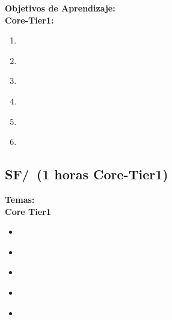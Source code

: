 \noindent \textbf{Objetivos de Aprendizaje:}\\
\noindent \textbf{Core-Tier1:}
\begin{enumerate}
	\setcounter{enumi}{0}
	\item \SFStateandStateMachinesLODescribeComputations\xspace[\SFStateandStateMachinesLODescribeComputationsLevel]\label{sec:BOK:SFStateandStateMachinesLODescribeComputations}
	\item \SFStateandStateMachinesLODescribeTheSystems\xspace[\SFStateandStateMachinesLODescribeTheSystemsLevel]\label{sec:BOK:SFStateandStateMachinesLODescribeTheSystems}
	\item \SFStateandStateMachinesLODescribeAA\xspace[\SFStateandStateMachinesLODescribeAALevel]\label{sec:BOK:SFStateandStateMachinesLODescribeAA}
	\item \SFStateandStateMachinesLOExplainHowOr\xspace[\SFStateandStateMachinesLOExplainHowOrLevel]\label{sec:BOK:SFStateandStateMachinesLOExplainHowOr}
	\item \SFStateandStateMachinesLODevelopState\xspace[\SFStateandStateMachinesLODevelopStateLevel]\label{sec:BOK:SFStateandStateMachinesLODevelopState}
	\item \SFStateandStateMachinesLODeriveTime\xspace[\SFStateandStateMachinesLODeriveTimeLevel]\label{sec:BOK:SFStateandStateMachinesLODeriveTime}
\end{enumerate}


\subsection{SF/\SFParallelism~(1 horas Core-Tier1)}\label{sec:BOK:SFParallelism}
\noindent \textbf{Temas:}\\
\noindent \textbf{Core Tier1}
\begin{itemize}
	\item \SFParallelismTopicSequential\label{sec:BOK:SFParallelismTopicSequential}
	\item \SFParallelismTopicParallel\label{sec:BOK:SFParallelismTopicParallel}
	\item \SFParallelismTopicRequest\label{sec:BOK:SFParallelismTopicRequest}
	\item \SFParallelismTopicClient\label{sec:BOK:SFParallelismTopicClient}
	\item \SFParallelismTopicMulticore\label{sec:BOK:SFParallelismTopicMulticore}
\end{itemize}


